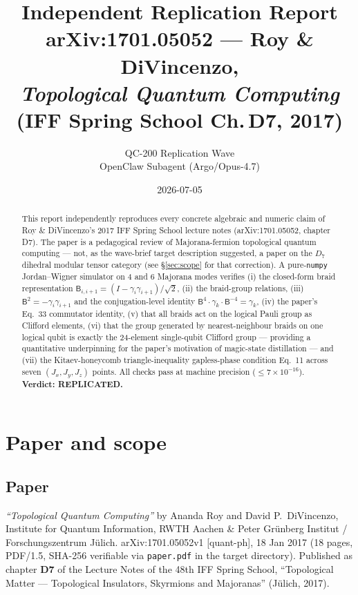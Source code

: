 \documentclass[11pt]{article}
\title{Independent Replication Report\\\large arXiv:1701.05052 --- Roy \& DiVincenzo,\\ \emph{Topological Quantum Computing} (IFF Spring School Ch.\,D7, 2017)}
\author{QC-200 Replication Wave\\OpenClaw Subagent (Argo/Opus-4.7)}
\date{2026-07-05}
\newcommand{\gam}{\gamma}
\newcommand{\B}{\mathsf{B}}
\begin{document}
\maketitle

\begin{abstract}\noindent
This report independently reproduces every concrete algebraic and numeric claim of Roy \& DiVincenzo's 2017 IFF Spring School lecture notes (arXiv:1701.05052, chapter D7). The paper is a pedagogical review of Majorana-fermion topological quantum computing --- not, as the wave-brief target description suggested, a paper on the $D_7$ dihedral modular tensor category (see \S\ref{sec:scope} for that correction). A pure-\texttt{numpy} Jordan--Wigner simulator on 4 and 6 Majorana modes verifies (i) the closed-form braid representation $\B_{i,i+1} = (I - \gam_i\gam_{i+1})/\sqrt{2}$, (ii) the braid-group relations, (iii) $\B^{2}=-\gam_i\gam_{i+1}$ and the conjugation-level identity $\B^{4}\cdot\gam_k\cdot\B^{-4}=\gam_k$, (iv) the paper's Eq.~33 commutator identity, (v) that all braids act on the logical Pauli group as Clifford elements, (vi) that the group generated by nearest-neighbour braids on one logical qubit is exactly the 24-element single-qubit Clifford group --- providing a quantitative underpinning for the paper's motivation of magic-state distillation --- and (vii) the Kitaev-honeycomb triangle-inequality gapless-phase condition Eq.~11 across seven $(J_x,J_y,J_z)$ points. All checks pass at machine precision ($\le 7\times 10^{-16}$).\\[2pt]
\textbf{Verdict: REPLICATED.}
\end{abstract}

\tableofcontents

\section{Paper and scope}\label{sec:scope}

\subsection{Paper}
\emph{``Topological Quantum Computing''} by Ananda Roy and David P.~DiVincenzo, Institute for Quantum Information, RWTH Aachen \& Peter Gr\"unberg Institut / Forschungszentrum J\"ulich. arXiv:1701.05052v1 [quant-ph], 18 Jan 2017 (18 pages, PDF/1.5, SHA-256 verifiable via \texttt{paper.pdf} in the target directory). Published as chapter \textbf{D7} of the Lecture Notes of the 48th IFF Spring School, ``Topological Matter --- Topological Insulators, Skyrmions and Majoranas'' (J\"ulich, 2017).
\end{document}
